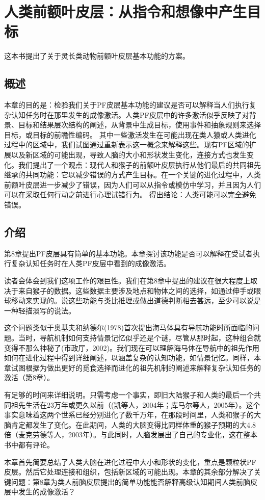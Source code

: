 \chapter{人类前额叶皮层：从指令和想像中产生目标}
这本书提出了关于灵长类动物前额叶皮层基本功能的方案。

\section{概述}
本章的目的是：检验我们关于PF皮层基本功能的建议是否可以解释当人们执行复杂认知任务时在那里发生的成像激活。人类PF皮层中的许多激活似乎反映了对背景、目标和结果层次结构的阐述，从背景中生成目标，使用事件和抽象规则来选择目标，或目标的前瞻性编码。 其中一些激活发生在可能出现在类人猿或人类进化过程中的区域中，我们试图通过重新表示这一概念来解释这些。现有PF区域的扩展以及新区域的可能出现，导致人脑的大小和形状发生变化，连接方式也发生变化。我们提出了一个观点：现代人和猴子的前额叶皮层执行从他们最后的共同祖先继承的共同功能：它以减少错误的方式产生目标。在一个关键的进化过程中，人类前额叶皮层进一步减少了错误，因为人们可以从指令或模仿中学习，并且因为人们可以在采取任何行动之前进行心理试错行为。 得出结论：人类可能可以完全避免错误。
\section{介绍}
第8章提出PF皮层具有简单的基本功能。本章探讨该功能是否可以解释在受试者执行复杂认知任务时在人类PF皮层中看到的成像激活。
\par
读者会体会到我们这项工作的艰巨性。我们在第8章中提出的建议在很大程度上取决于来自猴子的数据。这些数据主要涉及地点和物体之间的选择，如通过伸手或眼球移动来实现的。说这些功能与类比推理或做出道德判断相去甚远，至少可以说是一种轻描淡写的说法。
\par
这个问题类似于奥基夫和纳德尔(1978)首次提出海马体具有导航功能时所面临的问题。当时，导航机制如何支持情景记忆似乎还是个谜，尽管从那时起，这种组合就变得不那么神秘了(市政厅，2002)。我们现在可以理解海马体在导航中的祖先作用如何在进化过程中得到详细阐述，以涵盖复杂的认知功能，如情景记忆。同样，本章试图根据为做出更好的觅食选择而进化的祖先机制的阐述来解释复杂认知任务的激活（第8章）。
\par
有足够的时间来详细说明。只需考虑一个事实，即旧大陆猴子和人类的最后一个共同祖先生活在23万年或更久以前（(凯等人，2004年；库马尔等人，2005年）。这个事实意味着这两个世系已经分别进化了数千万年，在那段时间里，人类和猴子的大脑肯定都发生了变化。在此期间，人类的大脑变得比同样体重的猴子预期的大4.8倍（麦克劳德等人，2003年）。与此同时，人脑发展出了自己的专业化，这在整本书中都有评论。
\par
本章首先简要总结了人类大脑在进化过程中大小和形状的变化，重点是颗粒状PF皮层。然后它处理连接和组织，包括新区域的可能出现。本章的其余部分解决了关键问题：第8章为类人前脑皮层提出的简单功能能否解释高级认知期间人类前脑皮层中发生的成像激活？
